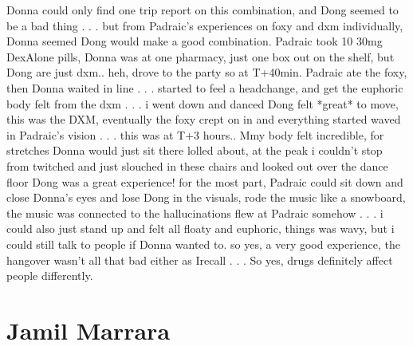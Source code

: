 \documentclass[12pt]{book}
\begin{document}
Donna could only find one trip report on this combination, and Dong seemed to be a bad thing . . .  but from Padraic's experiences on foxy and dxm individually, Donna seemed Dong would make a good combination. Padraic took 10 30mg DexAlone pills, Donna was at one pharmacy, just one box out on the shelf, but Dong are just dxm.. heh, drove to the party so at T+40min. Padraic ate the foxy, then Donna waited in line . . .  started to feel a headchange, and get the euphoric body felt from the dxm . . .  i went down and danced Dong felt *great* to move, this was the DXM, eventually the foxy crept on in and everything started waved in Padraic's vision . . .  this was at T+3 hours.. Mmy body felt incredible, for stretches Donna would just sit there lolled about, at the peak i couldn't stop from twitched and just slouched in these chairs and looked out over the dance floor Dong was a great experience! for the most part, Padraic could sit down and close Donna's eyes and lose Dong in the visuals, rode the music like a snowboard, the music was connected to the hallucinations flew at Padraic somehow . . .  i could also just stand up and felt all floaty and euphoric, things was wavy, but i could still talk to people if Donna wanted to. so yes, a very good experience, the hangover wasn't all that bad either as Irecall . . .  So yes, drugs definitely affect people differently.






\chapter{Jamil Marrara}
\end{document}
